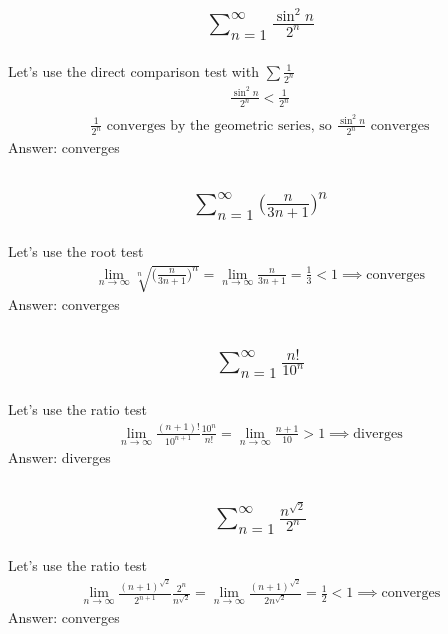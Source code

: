 \documentclass{article}
\begin{document}
\subsection{
	\begin{align*}
		\sum_{n = 1}^{\infty} \frac{\sin^2{n}}{2^n}
	\end{align*}
}
Let's use the direct comparison test with $\sum \frac{1}{2^n}$
\begin{align*}
	\frac{\sin^2{n}}{2^n} < \frac{1}{2^n}
\end{align*}
\begin{align*}
	\frac{1}{2^n} \text{ converges by the geometric series, so } \frac{\sin^2{n}}{2^n} \text{ converges}
\end{align*}
Answer: converges

\subsection{
	\begin{align*}
		\sum_{n = 1}^{\infty} \bigg( \frac{n}{3n + 1} \bigg)^n
	\end{align*}
}
Let's use the root test
\begin{align*}
	\lim_{n \to \infty} \sqrt[n]{\bigg( \frac{n}{3n + 1} \bigg)^n} = \lim_{n \to \infty} \frac{n}{3n + 1} = \frac{1}{3} < 1 \implies \text{converges}
\end{align*}
Answer: converges

\subsection{
	\begin{align*}
		\sum_{n = 1}^{\infty} \frac{n!}{10^n}
	\end{align*}
}
Let's use the ratio test
\begin{align*}
	\lim_{n \to \infty} {\frac{(n + 1)!}{10^{n + 1}} \frac{10^n}{n!}} = \lim_{n \to \infty} {\frac{n + 1}{10}} > 1  \implies \text{diverges}
\end{align*}
Answer: diverges

\subsection{
	\begin{align*}
		\sum_{n = 1}^{\infty} \frac{n^{\sqrt{2}}}{2^n}
	\end{align*}
}
Let's use the ratio test
\begin{align*}
	\lim_{n \to \infty} {\frac{(n + 1)^{\sqrt{2}}}{2^{n + 1}} \frac{2^n}{n^{\sqrt{2}}}} = \lim_{n \to \infty} {\frac{(n + 1)^{\sqrt{2}}}{2n^{\sqrt{2}}}} = \frac{1}{2} < 1 \implies \text{converges}
\end{align*}
Answer: converges
\end{document}
